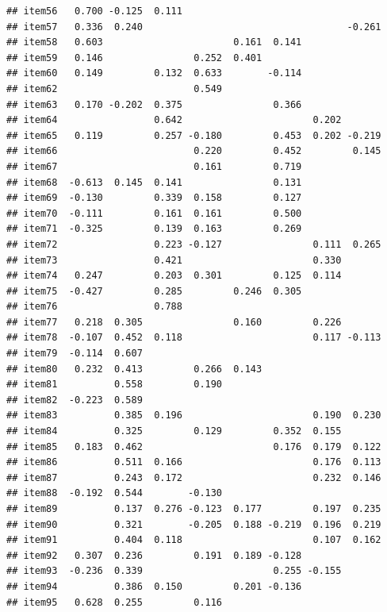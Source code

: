 \documentclass[
  english,
  man]{apa6}
\begin{document}
\begin{verbatim}
## item56   0.700 -0.125  0.111                                   
## item57   0.336  0.240                                    -0.261
## item58   0.603                       0.161  0.141              
## item59   0.146                0.252  0.401                     
## item60   0.149         0.132  0.633        -0.114              
## item62                        0.549                            
## item63   0.170 -0.202  0.375                0.366              
## item64                 0.642                       0.202       
## item65   0.119         0.257 -0.180         0.453  0.202 -0.219
## item66                        0.220         0.452         0.145
## item67                        0.161         0.719              
## item68  -0.613  0.145  0.141                0.131              
## item69  -0.130         0.339  0.158         0.127              
## item70  -0.111         0.161  0.161         0.500              
## item71  -0.325         0.139  0.163         0.269              
## item72                 0.223 -0.127                0.111  0.265
## item73                 0.421                       0.330       
## item74   0.247         0.203  0.301         0.125  0.114       
## item75  -0.427         0.285         0.246  0.305              
## item76                 0.788                                   
## item77   0.218  0.305                0.160         0.226       
## item78  -0.107  0.452  0.118                       0.117 -0.113
## item79  -0.114  0.607                                          
## item80   0.232  0.413         0.266  0.143                     
## item81          0.558         0.190                            
## item82  -0.223  0.589                                          
## item83          0.385  0.196                       0.190  0.230
## item84          0.325         0.129         0.352  0.155       
## item85   0.183  0.462                       0.176  0.179  0.122
## item86          0.511  0.166                       0.176  0.113
## item87          0.243  0.172                       0.232  0.146
## item88  -0.192  0.544        -0.130                            
## item89          0.137  0.276 -0.123  0.177         0.197  0.235
## item90          0.321        -0.205  0.188 -0.219  0.196  0.219
## item91          0.404  0.118                       0.107  0.162
## item92   0.307  0.236         0.191  0.189 -0.128              
## item93  -0.236  0.339                       0.255 -0.155       
## item94          0.386  0.150         0.201 -0.136              
## item95   0.628  0.255         0.116                            

\end{verbatim}
\end{document}
